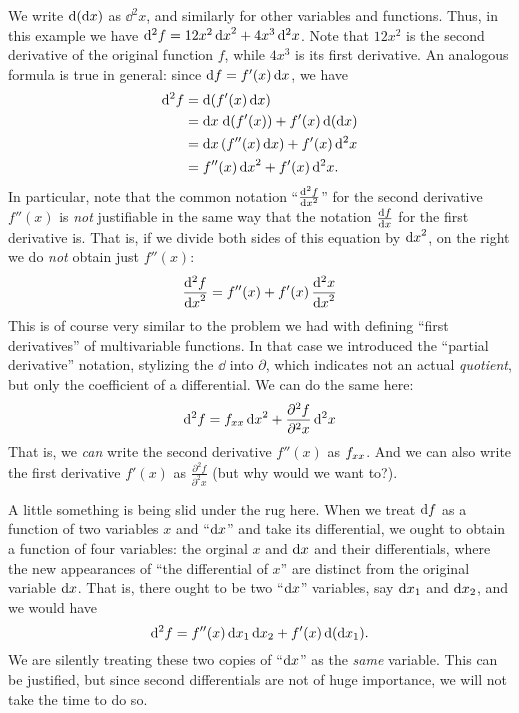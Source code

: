 We write $\mathrm{d}({\mathrm{d} x})$ as $\dd^2x$, and similarly for other variables and functions.
Thus, in this example we have $\mathrm{d}^2f = 12x^2\,{\mathrm{d} x}^2 + 4x^3 \, \mathrm{d}^2x$.
Note that $12x^2$ is the second derivative of the original function $f$, while $4x^3$ is its first derivative.
An analogous formula is true in general: since ${\mathrm{d} f} = f'(x) \,{\mathrm{d} x}$, we have
\begin{align}
  \mathrm{d}^2f &= \mathrm{d}(f'(x)\,{\mathrm{d} x}) \notag\\
  &= {\mathrm{d} x} \;\mathrm{d}(f'(x)) + f'(x) \, \mathrm{d}({\mathrm{d} x}) \notag\\
  &= {\mathrm{d} x} \,(f''(x)\, {\mathrm{d} x}) + f'(x) \, \mathrm{d}^2x \notag\\
  &= f''(x) \,{\mathrm{d} x}^2 + f'(x) \,\mathrm{d}^2x.\label{eq:second-differential}
\end{align}
In particular, note that the common notation ``$\frac{\mathrm{d}^2f}{{\mathrm{d} x}^2}$'' for the second derivative $f''(x)$ is \emph{not} justifiable in the same way that the notation $\frac{{\mathrm{d} f}}{{\mathrm{d} x}}$ for the first derivative is.
That is, if we divide both sides of this equation by ${\mathrm{d} x}^2$, on the right we do \emph{not} obtain just $f''(x)$:
\[ \frac{\mathrm{d}^2f}{{\mathrm{d} x}^2} = f''(x) + f'(x) \, \frac{\mathrm{d}^2x}{{\mathrm{d} x}^2} \]
This is of course very similar to the problem we had with defining ``first derivatives'' of multivariable functions.
In that case we introduced the ``partial derivative'' notation, stylizing the $\dd$ into $\partial$, which indicates not an actual \emph{quotient}, but only the coefficient of a differential.
We can do the same here:
\[ \mathrm{d}^2 f = {f}_{{x}{x}} \,{\mathrm{d} x}^2 + \frac{\partial^2 f}{\partial^2 x} \,\mathrm{d}^2x \]
That is, we \emph{can} write the second derivative $f''(x)$ as ${f}_{{x}{x}}$.
And we can also write the first derivative $f'(x)$ as $\frac{\partial^2 f}{\partial^2 x}$ (but why would we want to?).

\begin{adv}
  A little something is being slid under the rug here.
  When we treat ${\mathrm{d} f}$ as a function of two variables $x$ and ``${\mathrm{d} x}$'' and take its differential, we ought to obtain a function of four variables: the orginal $x$ and ${\mathrm{d} x}$ and their differentials, where the new appearances of ``the differential of $x$'' are distinct from the original variable ${\mathrm{d} x}$.
  That is, there ought to be two ``${\mathrm{d} x}$'' variables, say ${\mathrm{d} x}_1$ and ${\mathrm{d} x}_2$, and we would have
  \[ \mathrm{d}^2 f = f''(x) \,{\mathrm{d} x}_1\,{\mathrm{d} x}_2 + f'(x) \,\mathrm{d}({\mathrm{d} x}_1). \]
  We are silently treating these two copies of ``${\mathrm{d} x}$'' as the \emph{same} variable.
  This can be justified, but since second differentials are not of huge importance, we will not take the time to do so.
\end{adv}

